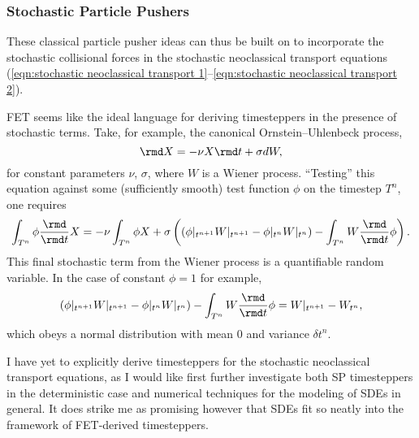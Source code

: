 \subsubsection{Stochastic Particle Pushers}
    These classical particle pusher ideas can thus be built on to incorporate the stochastic collisional forces in the stochastic neoclassical transport equations (\ref{eqn:stochastic neoclassical transport 1}--\ref{eqn:stochastic neoclassical transport 2}).

    \begin{remark}
        FET seems like the ideal language for deriving timesteppers in the presence of stochastic terms. Take, for example, the canonical Ornstein--Uhlenbeck process,
        \begin{equation}
            \rmd X  =  - \nu X\rmd t + \sigma dW,
        \end{equation}
        for constant parameters $\nu$, $\sigma$, where $W$ is a Wiener process. ``Testing'' this equation against some (sufficiently smooth) test function $\phi$ on the timestep $T^{n}$, one requires
        \begin{equation}
            \int_{T^{n}}\phi\frac{\rmd}{\rmd t}X  =  - \nu\int_{T^{n}}\phi X + \sigma\left(\left(\phi|_{t^{n + 1}}W|_{t^{n + 1}} - \phi|_{t^{n}}W|_{t^{n}}\right) - \int_{T^{n}}W\frac{\rmd}{\rmd t}\phi\right).
        \end{equation}
        This final stochastic term from the Wiener process is a quantifiable random variable. In the case of constant $\phi = 1$ for example,
        \begin{equation}
            \left(\phi|_{t^{n + 1}}W|_{t^{n + 1}} - \phi|_{t^{n}}W|_{t^{n}}\right) - \int_{T^{n}}W\frac{\rmd}{\rmd t}\phi
            =  W|_{t^{n + 1}} - W_{t^{n}},
        \end{equation}
        which obeys a normal distribution with mean $0$ and variance $\delta t^{n}$.

        I have yet to explicitly derive timesteppers for the stochastic neoclassical transport equations, as I would like first further investigate both SP timesteppers in the deterministic case and numerical techniques for the modeling of SDEs in general. It does strike me as promising however that SDEs fit so neatly into the framework of FET-derived timesteppers.
    \end{remark}

    
    
    
    